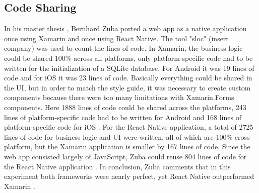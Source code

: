 \documentclass[Bachelor,BIF,english]{twbook}
\begin{document}
\subsection{Code Sharing}
In his master thesis \cite{ZubaBernhard2017EdPb}, Bernhard Zuba ported a web app as a native application once using Xamarin and once using React Native. The tool "sloc" (insert company) was used to count the lines of code. In Xamarin, the business logic could be shared 100\% across all platforms, only platform-specific code had to be written for the initialization of a SQLite database. For Android it was 19 lines of code and for iOS it was 23 lines of code. Basically everything could be shared in the UI, but in order to match the style guide, it was necessary to create custom components because there were too many limitations with Xamarin.Forms components. Here 1888 lines of code could be shared across the platforms, 243 lines of platform-specific code had to be written for Android and 168 lines of platform-specific code for iOS \cite[p.~71]{ZubaBernhard2017EdPb}. For the React Native application, a total of 2725 lines of code for business logic and UI were written, all of which are 100\% cross-platform, but the Xamarin application is smaller by 167 lines of code. Since the web app consisted largely of JavaScript, Zuba could reuse 804 lines of code for the React Native application \cite[p.~72]{ZubaBernhard2017EdPb}. In conclusion, Zuba comments that in this experiment both frameworks were nearly perfect, yet React Native outperformed Xamarin \cite[p.~72-73]{ZubaBernhard2017EdPb}.
\end{document}

